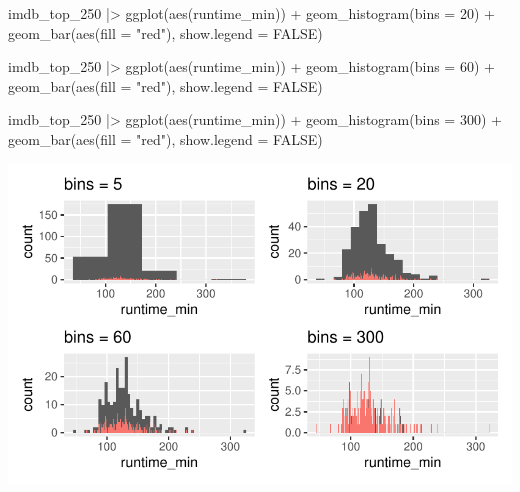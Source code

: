 \documentclass[
  letterpaper,
]{krantz}
\makeatletter
\newenvironment{Shaded}{\begin{snugshade}}{\end{snugshade}}
\newcommand{\AttributeTok}[1]{\textcolor[rgb]{0.40,0.45,0.13}{#1}}
\newcommand{\ConstantTok}[1]{\textcolor[rgb]{0.56,0.35,0.01}{#1}}
\newcommand{\DecValTok}[1]{\textcolor[rgb]{0.68,0.00,0.00}{#1}}
\newcommand{\FunctionTok}[1]{\textcolor[rgb]{0.28,0.35,0.67}{#1}}
\newcommand{\NormalTok}[1]{\textcolor[rgb]{0.00,0.23,0.31}{#1}}
\newcommand{\SpecialCharTok}[1]{\textcolor[rgb]{0.37,0.37,0.37}{#1}}
\newcommand{\StringTok}[1]{\textcolor[rgb]{0.13,0.47,0.30}{#1}}
\newenvironment{kframe}{%
\medskip{}
\setlength{\fboxsep}{.8em}
 \def\at@end@of@kframe{}%
 \ifinner\ifhmode%
  \def\at@end@of@kframe{\end{minipage}}%
  \begin{minipage}{\columnwidth}%
 \fi\fi%
 \def\FrameCommand##1{\hskip\@totalleftmargin \hskip-\fboxsep
 \colorbox{shadecolor}{##1}\hskip-\fboxsep
     \hskip-\linewidth \hskip-\@totalleftmargin \hskip\columnwidth}%
 \MakeFramed {\advance\hsize-\width
   \@totalleftmargin\z@ \linewidth\hsize
   \@setminipage}}%
 {\par\unskip\endMakeFramed%
 \at@end@of@kframe}
\renewenvironment{Shaded}{\begin{kframe}}{\end{kframe}}
\makeatother
\begin{document}
\begin{Shaded}
\begin{Highlighting}[]
\NormalTok{imdb\_top\_250 }\SpecialCharTok{|\textgreater{}}
  \FunctionTok{ggplot}\NormalTok{(}\FunctionTok{aes}\NormalTok{(runtime\_min)) }\SpecialCharTok{+}
  \FunctionTok{geom\_histogram}\NormalTok{(}\AttributeTok{bins =} \DecValTok{20}\NormalTok{) }\SpecialCharTok{+}
  \FunctionTok{geom\_bar}\NormalTok{(}\FunctionTok{aes}\NormalTok{(}\AttributeTok{fill =} \StringTok{"red"}\NormalTok{), }\AttributeTok{show.legend =} \ConstantTok{FALSE}\NormalTok{)}
\end{Highlighting}
\end{Shaded}

\begin{Shaded}
\begin{Highlighting}[]
\NormalTok{imdb\_top\_250 }\SpecialCharTok{|\textgreater{}}
  \FunctionTok{ggplot}\NormalTok{(}\FunctionTok{aes}\NormalTok{(runtime\_min)) }\SpecialCharTok{+}
  \FunctionTok{geom\_histogram}\NormalTok{(}\AttributeTok{bins =} \DecValTok{60}\NormalTok{) }\SpecialCharTok{+}
  \FunctionTok{geom\_bar}\NormalTok{(}\FunctionTok{aes}\NormalTok{(}\AttributeTok{fill =} \StringTok{"red"}\NormalTok{), }\AttributeTok{show.legend =} \ConstantTok{FALSE}\NormalTok{)}
\end{Highlighting}
\end{Shaded}

\begin{Shaded}
\begin{Highlighting}[]
\NormalTok{imdb\_top\_250 }\SpecialCharTok{|\textgreater{}}
  \FunctionTok{ggplot}\NormalTok{(}\FunctionTok{aes}\NormalTok{(runtime\_min)) }\SpecialCharTok{+}
  \FunctionTok{geom\_histogram}\NormalTok{(}\AttributeTok{bins =} \DecValTok{300}\NormalTok{) }\SpecialCharTok{+}
  \FunctionTok{geom\_bar}\NormalTok{(}\FunctionTok{aes}\NormalTok{(}\AttributeTok{fill =} \StringTok{"red"}\NormalTok{), }\AttributeTok{show.legend =} \ConstantTok{FALSE}\NormalTok{)}
\end{Highlighting}
\end{Shaded}

\includegraphics{08_descriptive_statistics_files/figure-pdf/histograms-bins-output-1.pdf}
\end{document}
